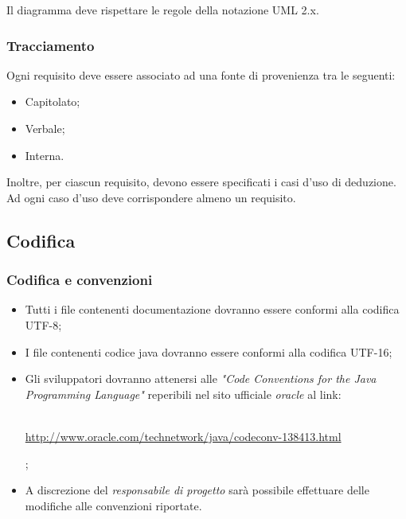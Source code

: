 \begin{flushleft}
Il diagramma deve rispettare le regole della notazione UML 2.x.
\end{flushleft}

\subsubsection{Tracciamento}
Ogni requisito deve essere associato ad una fonte di provenienza tra le seguenti:

\begin{itemize}
\item Capitolato;
\item Verbale;
\item Interna.
\end{itemize}
Inoltre, per ciascun requisito, devono essere specificati i casi d'uso di deduzione.\\
Ad ogni caso d'uso deve corrispondere almeno un requisito.

\subsection{Codifica}
\subsubsection{Codifica e convenzioni}
\begin{itemize}

\item Tutti i file contenenti documentazione dovranno essere conformi alla codifica UTF-8;

\item I file contenenti codice java  dovranno essere conformi alla codifica UTF-16;

\item Gli sviluppatori dovranno attenersi alle \textit{"Code Conventions for the Java Programming Language"} reperibili nel sito ufficiale \textit{oracle} al link:\\ \\
\centerline{ \url{http://www.oracle.com/technetwork/java/codeconv-138413.html}};

\item A discrezione del \textit{responsabile di progetto} sarà possibile effettuare delle modifiche alle convenzioni riportate.
\end{itemize}
